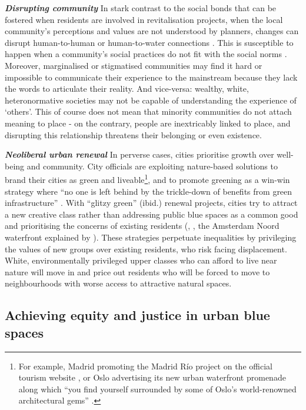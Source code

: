 \documentclass{article}
\newcommand{\bisection}[1]{\textbf{\textit{#1}}}
\begin{document}

\bisection{Disrupting community} 
In stark contrast to the social bonds that can be fostered when residents are involved in revitalisation projects, when the local community's perceptions and values are not understood by planners, changes can disrupt human-to-human or human-to-water connections \parencite{toomey2021place}. This is susceptible to happen when a community's social practices do not fit with the social norms \parencite{wessells2014urban}. 
Moreover, marginalised or stigmatised communities may find it hard or impossible to communicate their experience to the mainstream because they lack the words to articulate their reality. And vice-versa: wealthy, white, heteronormative societies may not be capable of understanding the experience of `others'. 
This of course does not mean that minority communities do not attach meaning to place - on the contrary, people are inextricably linked to place, and disrupting this relationship threatens their belonging or even existence.

\bisection{Neoliberal urban renewal} 
In perverse cases, cities prioritise growth over well-being and community. 
City officials are exploiting nature-based solutions to brand their cities as green and liveable\footnote{For example, Madrid promoting the Madrid Río project on the official tourism website \parencite{madridrio}, or Oslo advertising its new urban waterfront promenade along which ``you find yourself surrounded by some of Oslo's world-renowned architectural gems'' \parencite{visitoslo}.}, and to promote greening as a win-win strategy where ``no one is left behind by the trickle-down of benefits from green infrastructure'' \parencite{anguelovski2021green}.
With ``glitzy green'' (ibid.) renewal projects, cities try to attract a new creative class rather than addressing public blue spaces as a common good and prioritising the concerns of existing residents (\cite{wessells2014urban}, \cite{anguelovski2020expanding}, the Amsterdam Noord waterfront explained by \cite{del2021dismantling}).
These strategies perpetuate inequalities by privileging the values of new groups over existing residents, who risk facing displacement. White, environmentally privileged upper classes who can afford to live near nature will move in and price out residents who will be forced to move to neighbourhoods with worse access to attractive natural spaces.

\subsection{Achieving equity and justice in urban blue spaces}
\end{document}
